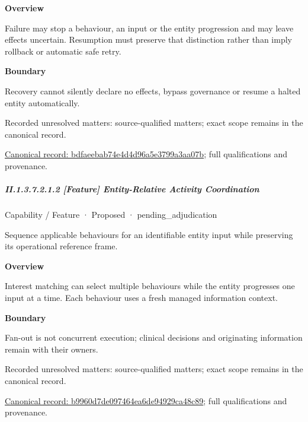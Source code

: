 \textbf{Overview}



Failure may stop a behaviour, an input or the entity progression and may leave effects uncertain. Resumption must preserve that distinction rather than imply rollback or automatic safe retry.



\textbf{Boundary}



Recovery cannot silently declare no effects, bypass governance or resume a halted entity automatically.


{\small Recorded unresolved matters: source-qualified matters; exact scope remains in the canonical record.}\par
{\footnotesize \href{../../../../../../../continuum/strategy/capability/feature/bdfaeebab74e4d4d96a5e3799a3aa07b.md}{Canonical record: bdfaeebab74e4d4d96a5e3799a3aa07b}; full qualifications and provenance.}\par
\subparagraph*{II.1.3.7.2.1.2 [Feature] Entity-Relative Activity Coordination}
\label{navigation:II.1.3.7.2.1.2}

\label{element:b9960d7de097464ea6de94929ca48c89}
{\small Capability / Feature · Proposed · pending\_adjudication}\par

Sequence applicable behaviours for an identifiable entity input while preserving its operational reference frame.



\textbf{Overview}



Interest matching can select multiple behaviours while the entity progresses one input at a time. Each behaviour uses a fresh managed information context.



\textbf{Boundary}



Fan-out is not concurrent execution; clinical decisions and originating information remain with their owners.


{\small Recorded unresolved matters: source-qualified matters; exact scope remains in the canonical record.}\par
{\footnotesize \href{../../../../../../../continuum/strategy/capability/feature/b9960d7de097464ea6de94929ca48c89.md}{Canonical record: b9960d7de097464ea6de94929ca48c89}; full qualifications and provenance.}\par
